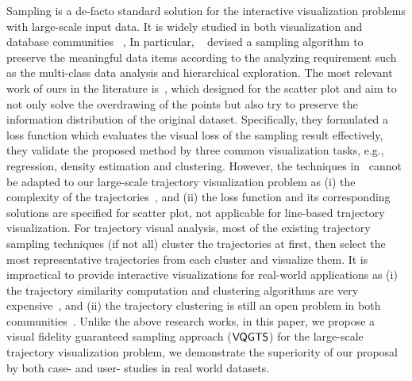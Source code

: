 Sampling is a de-facto standard solution for the interactive visualization problems with large-scale input data.
It is widely studied in both visualization and database communities ~\cite{battle2013dynamic,chen2014visual,park2016visualization},
In particular, ~\cite{chen2014visual} devised a sampling algorithm to preserve the meaningful data items according to the analyzing requirement such as the multi-class data analysis and hierarchical exploration.
The most relevant work of ours in the literature is~\cite{park2016visualization}, which designed for the scatter plot and aim to not only solve the overdrawing of the points but also try to preserve the information distribution of the original dataset.
Specifically, they formulated a loss function which evaluates the visual loss of the sampling result effectively,
they validate the proposed method by three common visualization tasks, e.g., regression, density estimation and clustering.
However, the techniques in~\cite{park2016visualization} cannot be adapted to our large-scale trajectory visualization problem
as (i) the complexity of the trajectories~\cite{pelekis2010unsupervised}, and (ii) the loss function and its corresponding solutions are specified for scatter plot, not applicable for line-based trajectory visualization.
For trajectory visual analysis,  most of the existing trajectory sampling techniques (if not all) cluster the trajectories at first,
then select the most representative trajectories from each cluster and visualize them.
It is impractical to provide interactive visualizations for real-world applications as
(i) the trajectory similarity computation and clustering algorithms are very expensive~\cite{pelekis2007similarity},
and (ii) the trajectory clustering is still an open problem in both communities~\cite{panagiotakis2011segmentation,agarwal2018subtrajectory}.
Unlike the above research works, in this paper, we propose a visual fidelity guaranteed sampling approach ($\mathsf{VQGTS}{}$) for the large-scale trajectory visualization problem,
we demonstrate the superiority of our proposal by both case- and user- studies in real world datasets.






